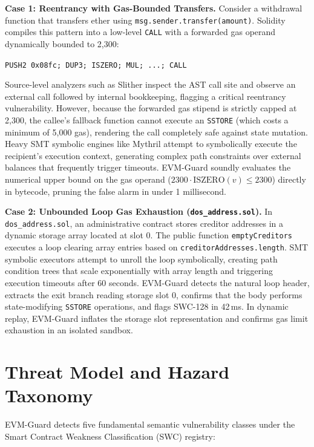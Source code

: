\documentclass[conference]{IEEEtran}
\begin{document}
\smallskip
\noindent\textbf{Case 1: Reentrancy with Gas-Bounded Transfers.}
Consider a withdrawal function that transfers ether using \texttt{msg.sender.transfer(amount)}. Solidity compiles this pattern into a low-level \texttt{CALL} with a forwarded gas operand dynamically bounded to 2,300:
\begin{center}
\small
\texttt{PUSH2 0x08fc; DUP3; ISZERO; MUL; ...; CALL}
\end{center}
Source-level analyzers such as Slither inspect the AST call site and observe an external call followed by internal bookkeeping, flagging a critical reentrancy vulnerability. However, because the forwarded gas stipend is strictly capped at 2,300, the callee's fallback function cannot execute an \texttt{SSTORE} (which costs a minimum of 5,000 gas), rendering the call completely safe against state mutation. Heavy SMT symbolic engines like Mythril attempt to symbolically execute the recipient's execution context, generating complex path constraints over external balances that frequently trigger timeouts. EVM-Guard soundly evaluates the numerical upper bound on the gas operand ($2300 \cdot \mathrm{ISZERO}(v) \le 2300$) directly in bytecode, pruning the false alarm in under 1 millisecond.

\smallskip
\noindent\textbf{Case 2: Unbounded Loop Gas Exhaustion (\texttt{dos\_address.sol}).}
In \texttt{dos\_address.sol}, an administrative contract stores creditor addresses in a dynamic storage array located at slot 0. The public function \texttt{emptyCreditors} executes a loop clearing array entries based on \texttt{creditorAddresses.length}. SMT symbolic executors attempt to unroll the loop symbolically, creating path condition trees that scale exponentially with array length and triggering execution timeouts after 60 seconds. EVM-Guard detects the natural loop header, extracts the exit branch reading storage slot 0, confirms that the body performs state-modifying \texttt{SSTORE} operations, and flags SWC-128 in 42\,ms. In dynamic replay, EVM-Guard inflates the storage slot representation and confirms gas limit exhaustion in an isolated sandbox.

\section{Threat Model and Hazard Taxonomy}\label{sec:taxonomy}

EVM-Guard detects five fundamental semantic vulnerability classes under the Smart Contract Weakness Classification (SWC) registry:
\end{document}
